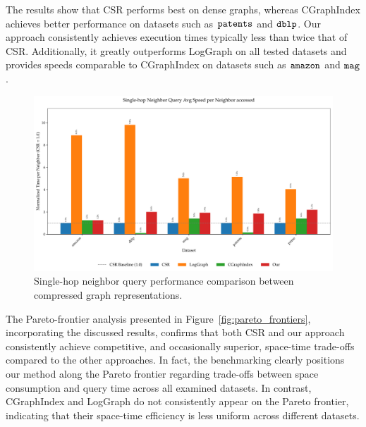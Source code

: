 The results show that CSR performs best on dense graphs, whereas CGraphIndex achieves better performance on datasets such as $\verb^patents^$ and $\verb^dblp^$. Our approach consistently achieves execution times typically less than twice that of CSR. Additionally, it greatly outperforms LogGraph on all tested datasets and provides speeds comparable to CGraphIndex on datasets such as $\verb^amazon^$ and $\verb^mag^$.

\begin{figure}[htbp]
  \centering
  \includegraphics[width=\linewidth]{plots/adj_neighbors_comparison.pdf}
  \caption{Single-hop neighbor query performance comparison between compressed graph representations.}
  \label{fig:adj_time_comparison}
\end{figure}
\FloatBarrier

The Pareto-frontier analysis presented in Figure~\ref{fig:pareto_frontiers}, incorporating the discussed results, confirms that both CSR and our approach consistently achieve competitive, and occasionally superior, space-time trade-offs compared to the other approaches. In fact, the benchmarking clearly positions our method along the Pareto frontier regarding trade-offs between space consumption and query time across all examined datasets. In contrast, CGraphIndex and LogGraph do not consistently appear on the Pareto frontier, indicating that their space-time efficiency is less uniform across different datasets.

